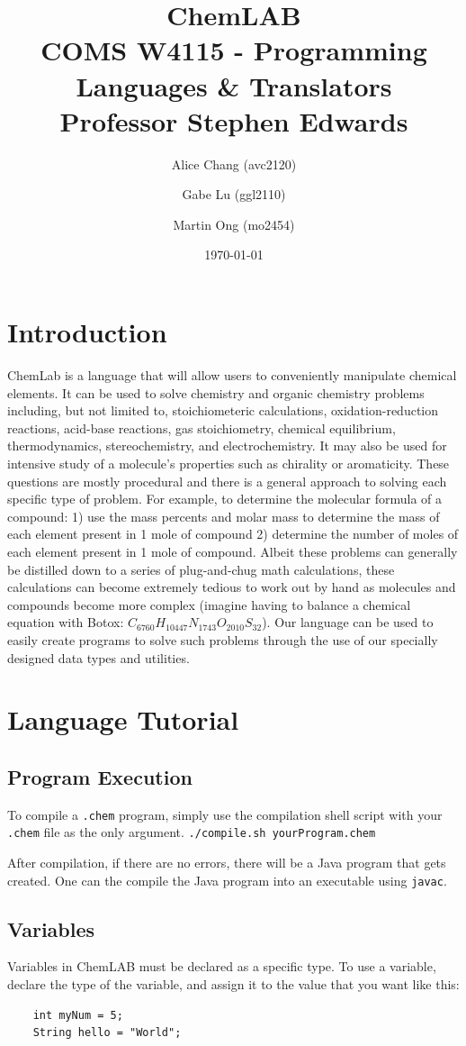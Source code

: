 \documentclass[11pt]{report}
\title{ChemLAB \\
COMS W4115 - Programming Languages \& Translators \\
Professor Stephen Edwards}
\author{Alice Chang (avc2120) \and Gabe Lu (ggl2110) \and Martin Ong (mo2454)}
\date{\today}                          %
\begin{document}
\maketitle
\tableofcontents

\chapter*{Introduction}
ChemLab is a language that will allow users to conveniently manipulate chemical elements. It can be used to solve chemistry and organic chemistry problems including, but not limited to,  stoichiometeric calculations, oxidation-reduction reactions, acid-base reactions, gas stoichiometry, chemical equilibrium, thermodynamics, stereochemistry, and electrochemistry. It may also be used for intensive study of a molecule's properties such as chirality or aromaticity. These questions are mostly procedural and there is a general approach to solving each specific type of problem. For example, to determine the molecular formula of a compound: 1) use the mass percents and molar mass to determine the mass of each element present in 1 mole of compound 2) determine the number of moles of each element present in 1 mole of compound. Albeit these problems can generally be distilled down to a series of plug-and-chug math calculations, these calculations can become extremely tedious to work out by hand as molecules and compounds become more complex (imagine having to balance a chemical equation with Botox: $C_{6760}H_{10447}N_{1743}O_{2010}S_{32}$). Our language can be used to easily create programs to solve such problems through the use of our specially designed data types and utilities.

\chapter{Language Tutorial}
\section{Program Execution}
To compile a \texttt{.chem} program, simply use the compilation shell script with your \texttt{.chem} file as the only argument.
\texttt{./compile.sh yourProgram.chem}

After compilation, if there are no errors, there will be a  Java program that gets created. One can the compile the Java program into an executable using \texttt{javac}. 

\section{Variables}
Variables in ChemLAB must be declared as a specific type. To use a variable, declare the type of the variable, and assign it to the value that you want like this:
	\begin{verbatim}
	int myNum = 5;
	String hello = "World"; 
	\end{verbatim}
\end{document}
